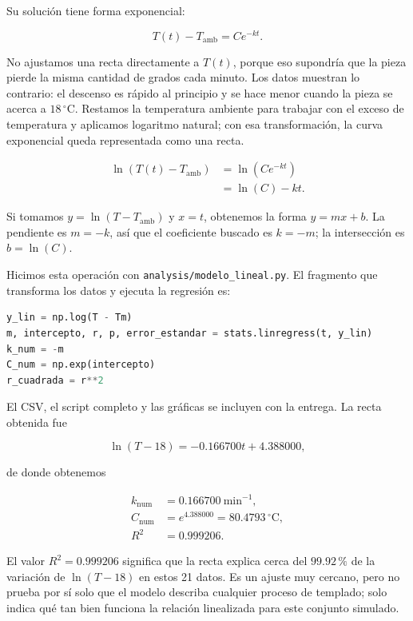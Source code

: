 \documentclass[11pt,onecolumn,letterpaper]{article}
\newcommand{\Tamb}{T_{\mathrm{amb}}}
\begin{document}
Su solución tiene forma exponencial:

\begin{equation*}
    T(t)-\Tamb=Ce^{-kt}.
\end{equation*}

No ajustamos una recta directamente a \(T(t)\), porque eso supondría que la pieza pierde la misma cantidad de grados cada minuto. Los datos muestran lo contrario: el descenso es rápido al principio y se hace menor cuando la pieza se acerca a \(18\,^{\circ}\mathrm{C}\). Restamos la temperatura ambiente para trabajar con el exceso de temperatura y aplicamos logaritmo natural; con esa transformación, la curva exponencial queda representada como una recta.

\begin{align*}
    \ln\left(T(t)-\Tamb\right)
        &=\ln\left(Ce^{-kt}\right) \\
        &=\ln(C)-kt.
\end{align*}

Si tomamos \(y=\ln(T-\Tamb)\) y \(x=t\), obtenemos la forma \(y=mx+b\). La pendiente es \(m=-k\), así que el coeficiente buscado es \(k=-m\); la intersección es \(b=\ln(C)\).

Hicimos esta operación con \texttt{analysis/modelo\_lineal.py}. El fragmento que transforma los datos y ejecuta la regresión es:

\begin{lstlisting}[language=Python,caption={Fragmento usado para linealizar los datos y obtener la recta.},label={lst:regresion}]
y_lin = np.log(T - Tm)
m, intercepto, r, p, error_estandar = stats.linregress(t, y_lin)
k_num = -m
C_num = np.exp(intercepto)
r_cuadrada = r**2
\end{lstlisting}

El CSV, el script completo y las gráficas se incluyen con la entrega. La recta obtenida fue

\begin{equation*}
    \ln(T-18)=-0.166700t+4.388000,
\end{equation*}

de donde obtenemos

\begin{align*}
    k_{\mathrm{num}} &= 0.166700\ \mathrm{min}^{-1}, \\
    C_{\mathrm{num}} &= e^{4.388000}=80.4793\,^{\circ}\mathrm{C}, \\
    R^2 &= 0.999206.
\end{align*}

El valor \(R^2=0.999206\) significa que la recta explica cerca del \(99.92\,\%\) de la variación de \(\ln(T-18)\) en estos 21 datos. Es un ajuste muy cercano, pero no prueba por sí solo que el modelo describa cualquier proceso de templado; solo indica qué tan bien funciona la relación linealizada para este conjunto simulado.
\end{document}
